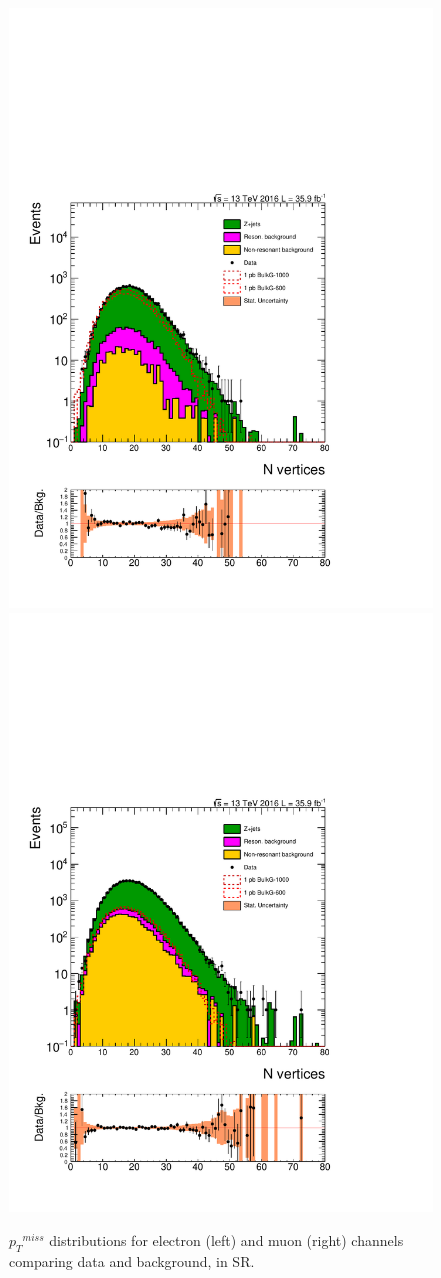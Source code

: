 \begin{figure}[htbp!]
\centering
\includegraphics[width=0.46\linewidth,page=18]{figures/ReMiniSummer16_DT_PhReMiniMCRcFixXsec_GMCPhPtWt_SRdPhiGT0p5_puWeightsummer16_muoneg_gjet_metfilter_unblind_el_log_1pb.pdf}
\includegraphics[width=0.46\linewidth,page=18]{figures/ReMiniSummer16_DT_PhReMiniMCRcFixXsec_GMCPhPtWt_SRdPhiGT0p5_puWeightsummer16_muoneg_gjet_metfilter_unblind_mu_log_1pb.pdf}
\caption{${p_{T}}^{miss}$ distributions for electron (left) and muon (right) channels
comparing data and background, in SR.}
\label{fig:SR_gjet_met_narrow}
\end{figure}

